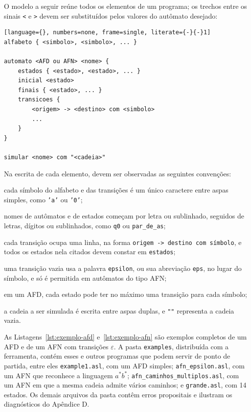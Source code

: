 \documentclass[
    12pt
    ,oneside
    ,a4paper
    ,chapter=TITLE
    ,section=TITLE
    ,sumario=abnt-6027-2012]{abntex2}
\begin{document}
O modelo a seguir reúne todos os elementos de um programa; os trechos entre os sinais
\texttt{<} e \texttt{>} devem ser substituídos pelos valores do autômato desejado:

\begin{lstlisting}[language={}, numbers=none, frame=single, literate={-}{-}1]
alfabeto { <simbolo>, <simbolo>, ... }

automato <AFD ou AFN> <nome> {
    estados { <estado>, <estado>, ... }
    inicial <estado>
    finais { <estado>, ... }
    transicoes {
        <origem> -> <destino> com <simbolo>
        ...
    }
}

simular <nome> com "<cadeia>"
\end{lstlisting}

Na escrita de cada elemento, devem ser observadas as seguintes convenções:

\begin{alineas}
    \item cada símbolo do alfabeto e das transições é um único caractere entre aspas
    simples, como \texttt{'a'} ou \texttt{'0'};
    \item nomes de autômatos e de estados começam por letra ou sublinhado, seguidos de
    letras, dígitos ou sublinhados, como \texttt{q0} ou \texttt{par\_de\_as};
    \item cada transição ocupa uma linha, na forma \texttt{origem -> destino com
    símbolo}, e todos os estados nela citados devem constar em \texttt{estados};
    \item uma transição vazia usa a palavra \texttt{epsilon}, ou sua abreviação
    \texttt{eps}, no lugar do símbolo, e só é permitida em autômatos do tipo AFN;
    \item em um AFD, cada estado pode ter no máximo uma transição para cada símbolo;
    \item a cadeia a ser simulada é escrita entre aspas duplas, e \texttt{\string"\string"} representa a
    cadeia vazia.
\end{alineas}

As Listagens~\ref{lst:exemplo-afd} e~\ref{lst:exemplo-afn} são exemplos completos de um
AFD e de um AFN com transições $\varepsilon$. A pasta \texttt{examples}, distribuída com a
ferramenta, contém esses e outros programas que podem servir de ponto de partida, entre
eles \texttt{example1.asl}, com um AFD simples; \texttt{afn\_epsilon.asl}, com um AFN que
reconhece a linguagem $a^*b^*$; \texttt{afn\_caminhos\_multiplos.asl}, com um AFN em que a
mesma cadeia admite vários caminhos; e \texttt{grande.asl}, com 14 estados. Os demais
arquivos da pasta contêm erros propositais e ilustram os diagnósticos do Apêndice D.
\end{document}
